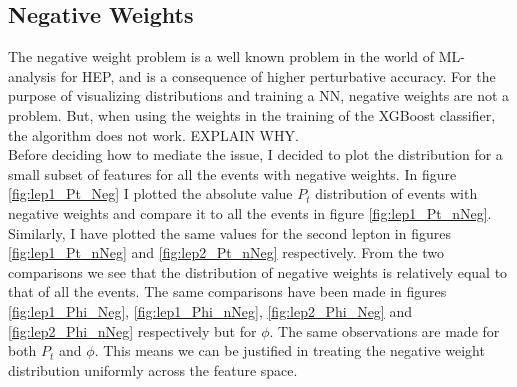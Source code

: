 \subsection{Negative Weights}
The negative weight problem is a well known problem in the world of ML-analysis for HEP, 
and is a consequence of higher perturbative accuracy. For the purpose of visualizing 
distributions and training a \ac{NN}, negative weights are not a problem. But, when using 
the weights in the training of the XGBoost classifier, the algorithm does not work. EXPLAIN
WHY. 
\\
Before deciding how to mediate the issue, I decided to plot the distribution for 
a small subset of features for all the events with negative weights.
In figure \ref{fig:lep1_Pt_Neg} I plotted the absolute value $P_t$ distribution of events with
negative weights and compare it to all the events in figure \ref{fig:lep1_Pt_nNeg}. Similarly,
I have plotted the same values for the second lepton in figures \ref{fig:lep1_Pt_nNeg} and \ref{fig:lep2_Pt_nNeg}
respectively. From the two comparisons we see that the distribution of negative
weights is relatively equal to that of all the events. The same comparisons have
been made in figures \ref{fig:lep1_Phi_Neg}, \ref{fig:lep1_Phi_nNeg}, \ref{fig:lep2_Phi_Neg}  
and \ref{fig:lep2_Phi_nNeg} respectively but for $\phi$. The same observations
are made for both $P_t$ and $\phi$. This means we can be justified in treating the 
negative weight distribution uniformly across the feature space.
